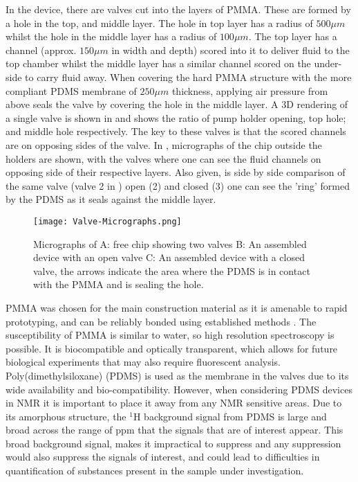 In the device, there are valves cut into the layers of PMMA. These are formed by a hole
in the top, and middle layer. The hole in top layer has a radius of $500 \mu m$ whilst the
hole in the middle layer has a radius of $100 \mu m$. The top layer has a channel (approx.
$150\mu m$ in width and depth) scored into it to deliver fluid to the top chamber whilst
the middle layer has a similar channel scored on the under-side to carry fluid away. When covering the hard
PMMA structure with the more compliant PDMS membrane of $250 \mu m$ thickness, applying
air pressure from above seals the valve by covering the hole in the middle layer. A 3D rendering of a single
valve is shown in  and shows the ratio of pump holder opening, top hole; and middle hole
respectively. The key to these valves is that the scored channels are on opposing sides of the valve. In ,
micrographs of the chip outside the holders are shown, with the valves
where one can see the fluid channels on opposing side of their respective layers. Also given,
is side by side comparison of the same valve (valve 2 in ) open (2) and closed
(3) one can see the 'ring' formed by the PDMS as it seals against the middle layer.

\begin{figure}[ht]
  \begin{center}
  \texttt{[image: Valve-Micrographs.png]}
  \caption{Micrographs of A: free chip showing two valves B: An assembled device with an
  open valve C: An assembled device with a closed valve, the arrows indicate the area where the PDMS is
  in contact with the PMMA and is sealing the hole.}
  \label{fig:Micrographs}
  \end{center}
\end{figure}

PMMA was chosen for the main construction material as it is amenable to rapid prototyping, and can be
reliably bonded using established methods \citep{RN2}. The susceptibility of PMMA is similar to water, so
high resolution spectroscopy is possible. It is biocompatible and optically transparent, which allows
for future biological experiments that may also require fluorescent analysis. Poly(dimethylsiloxane) (PDMS)
is used as the membrane in the valves due to its wide availability and bio-compatibility. However, when
considering PDMS devices in NMR it is important to place it away from any NMR sensitive areas. Due to its amorphous structure,
the $^1$H background signal from PDMS is large and broad across the range of ppm that the signals that are of interest
appear. This broad background signal, makes it impractical to suppress and any suppression would also suppress the
signals of interest, and could lead to difficulties in quantification of
substances present in the sample under investigation.

